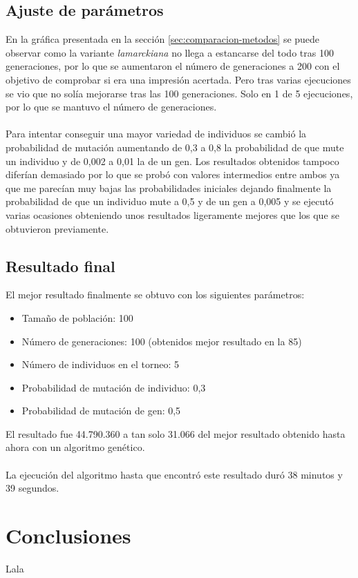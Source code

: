 \subsection{Ajuste de parámetros}

En la gráfica presentada en la sección \ref{sec:comparacion-metodos} se puede observar como la variante \textit{lamarckiana} no llega a estancarse del todo tras 100 generaciones, por lo que se aumentaron el número de generaciones a 200 con el objetivo de comprobar si era una impresión acertada. Pero tras varias ejecuciones se vio que no solía mejorarse tras las 100 generaciones. Solo en 1 de 5 ejecuciones, por lo que se mantuvo el número de generaciones.
\\ \\
Para intentar conseguir una mayor variedad de individuos se cambió la probabilidad de mutación aumentando de 0,3 a 0,8 la probabilidad de que mute un individuo y de 0,002 a 0,01 la de un gen. Los resultados obtenidos tampoco diferían demasiado por lo que se probó con valores intermedios entre ambos ya que me parecían muy bajas las probabilidades iniciales dejando finalmente la probabilidad de que un individuo mute a 0,5 y de un gen a 0,005 y se ejecutó varias ocasiones obteniendo unos resultados ligeramente mejores que los que se obtuvieron previamente.

\subsection{Resultado final}

El mejor resultado finalmente se obtuvo con los siguientes parámetros:

\begin{itemize}
	\item Tamaño de población: 100
	\item Número de generaciones: 100 (obtenidos mejor resultado en la 85)
	\item Número de individuos en el torneo: 5
	\item Probabilidad de mutación de individuo: 0,3
	\item Probabilidad de mutación de gen: 0,5
\end{itemize}

El resultado fue 44.790.360 a tan solo 31.066 del mejor resultado obtenido hasta ahora con un algoritmo genético.
\\ \\
La ejecución del algoritmo hasta que encontró este resultado duró 38 minutos y 39 segundos.

\section{Conclusiones}

Lala



\newpage


